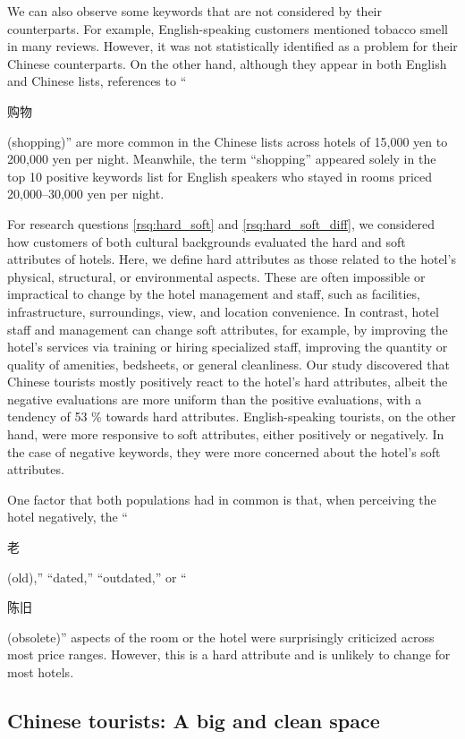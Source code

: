 \documentclass[smallextended,natbib]{svjour3}       %
\begin{document}
    We can also observe some keywords that are not considered by their counterparts. For example, English-speaking customers mentioned tobacco smell in many reviews. However, it was not statistically identified as a problem for their Chinese counterparts. On the other hand, although they appear in both English and Chinese lists, references to ``\begin{CJK}{UTF8}{gbsn}购物\end{CJK} (shopping)'' are more common in the Chinese lists across hotels of 15,000 yen to 200,000 yen per night. Meanwhile, the term ``shopping'' appeared solely in the top 10 positive keywords list for English speakers who stayed in rooms priced 20,000–30,000 yen per night.

    For research questions \ref{rsq:hard_soft} and \ref{rsq:hard_soft_diff}, we considered how customers of both cultural backgrounds evaluated the hard and soft attributes of hotels. Here, we define hard attributes as those related to the hotel's physical, structural, or environmental aspects. These are often impossible or impractical to change by the hotel management and staff, such as facilities, infrastructure, surroundings, view, and location convenience. In contrast, hotel staff and management can change soft attributes, for example, by improving the hotel's services via training or hiring specialized staff, improving the quantity or quality of amenities, bedsheets, or general cleanliness. Our study discovered that Chinese tourists mostly positively react to the hotel's hard attributes, albeit the negative evaluations are more uniform than the positive evaluations, with a tendency of 53 \% towards hard attributes. English-speaking tourists, on the other hand, were more responsive to soft attributes, either positively or negatively. In the case of negative keywords, they were more concerned about the hotel's soft attributes.

    One factor that both populations had in common is that, when perceiving the hotel negatively, the ``\begin{CJK}{UTF8}{gbsn}老\end{CJK} (old),'' ``dated,'' ``outdated,'' or ``\begin{CJK}{UTF8}{gbsn}陈旧\end{CJK} (obsolete)'' aspects of the room or the hotel were surprisingly criticized across most price ranges. However, this is a hard attribute and is unlikely to change for most hotels.
    
  \subsection{Chinese tourists: A big and clean space}\label{disc:zh}
\end{document}
